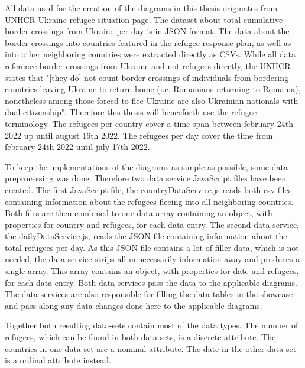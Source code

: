 All data used for the creation of the diagrams in this thesis originates from UNHCR Ukraine refugee situation page\cite{unhcr}. The dataset about total cumulative border crossings from Ukraine per day\cite{unhcr_rpd} is in JSON format. The data about the border crossings into countries featured in the refugee response plan, as well as into other neighboring countries\cite{unhcr} were extracted directly as CSVs. While all data reference border crossings from Ukraine and not refugees directly, the UNHCR states that "[they do] not count border crossings of individuals from bordering countries leaving Ukraine to return home (i.e. Romanians returning to Romania), nonetheless among those forced to flee Ukraine are also Ukrainian nationals with dual citizenship"\cite{unhcr_note}. Therefore this thesis will henceforth use the refugee terminology.
The refugees per country cover a time-span between february 24th 2022 up until august 16th 2022\cite{unhcr}. The refugees per day cover the time from february 24th 2022 until july 17th 2022\cite{unhcr_rpd}.




To keep the implementations of the diagrams as simple as possible, some data preprocessing was done. Therefore two data service JavaScript files have been created. The first JavaScript file, the countryDataService.js reads both csv files containing information about the refugees fleeing into all neighboring countries. Both files are then combined to one data array containing an object, with properties for country and refugees, for each data entry. The second data service, the dailyDataService.js, reads the JSON file containing information about the total refugees per day. As this JSON file contains a lot of filler data, which is not needed, the data service strips all unnecessarily information away and produces a single array. This array contains an object, with properties for date and refugees, for each data entry. Both data services pass the data to the applicable diagrams. The data services are also responsible for filling the data tables in the showcase and pass along any data changes done here to the applicable diagrams.


Together both resulting data-sets contain most of the data types. The number of refugees, which can be found in both data-sets, is a discrete attribute. The countries in one data-set are a nominal attribute. The date in the other data-set is a ordinal attribute instead.




